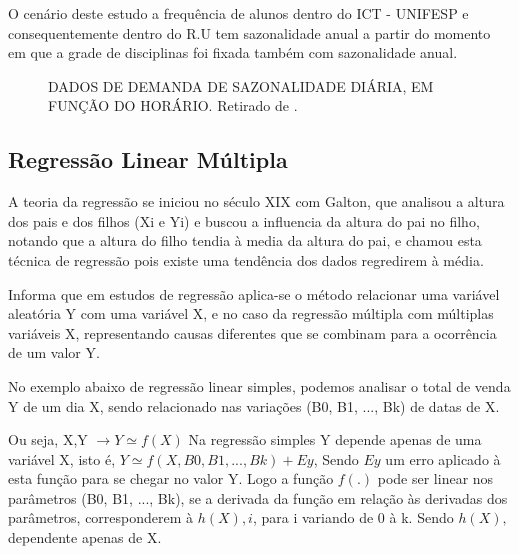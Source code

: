\documentclass[	12pt, Times, openright, twoside, a4paper, english, brazil]{abntex2}
\begin{document}
O cenário deste estudo a frequência de alunos dentro do ICT - UNIFESP e consequentemente dentro do R.U tem sazonalidade anual a partir do momento em que a grade de disciplinas foi fixada também com sazonalidade anual. 

\begin{figure}[!ht]
	\caption{DADOS DE DEMANDA DE SAZONALIDADE DIÁRIA, EM FUNÇÃO DO HORÁRIO. Retirado de \cite{RUAS2012}.\label{fig:seriesTemporais}}
\end{figure}

\subsection{Regressão Linear Múltipla}
A teoria da regressão se iniciou no século XIX com Galton, que analisou a altura dos pais e dos filhos (Xi e Yi) e buscou a influencia da altura do pai no filho, notando que a altura do filho tendia à media da altura do pai, e chamou esta técnica de regressão pois existe uma tendência dos dados regredirem à média.

\cite{Clarice2011} Informa que em estudos de regressão aplica-se o método relacionar uma variável aleatória Y com uma variável X, e no caso da regressão múltipla com múltiplas variáveis X, representando causas diferentes que se combinam para a ocorrência de um valor Y. 

No exemplo abaixo de regressão linear simples, podemos analisar o total de venda Y de um dia X, sendo relacionado nas variações (B0, B1, ..., Bk) de datas de X.

Ou seja, X,Y $\rightarrow Y \simeq f(X) $
Na regressão simples Y depende apenas de uma variável X, isto é, $Y \simeq f(X, B0, B1, ..., Bk) + Ey$, Sendo $Ey$ um erro aplicado à esta função para se chegar no valor Y. Logo a função $f(.)$ pode ser linear nos parâmetros (B0, B1, ..., Bk), se a derivada da função em relação às derivadas dos parâmetros, corresponderem à $h(X),i$, para i variando de 0 à k. Sendo $h(X),$ dependente apenas de X.
\end{document}
